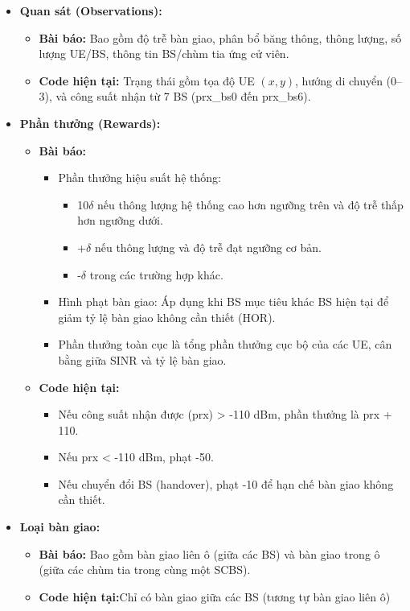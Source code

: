\documentclass{article} %
\begin{document}
\begin{itemize}
    \item \textbf{Quan sát (Observations):} 
    \begin{itemize}
        \item \textbf{Bài báo:} Bao gồm độ trễ bàn giao, phân bổ băng thông, thông lượng, số lượng UE/BS, thông tin BS/chùm tia ứng cử viên.
        \item \textbf{Code hiện tại:} Trạng thái gồm tọa độ UE $(x, y)$, hướng di chuyển (0–3), và công suất nhận từ 7 BS (prx\_bs0 đến prx\_bs6).
    \end{itemize}
        \item \textbf{Phần thưởng (Rewards):} 
        \begin{itemize}
            \item \textbf{Bài báo:} 
            \begin{itemize}
                \item Phần thưởng hiệu suất hệ thống:
                \begin{itemize}
                    \item 10$\delta$ nếu thông lượng hệ thống cao hơn ngưỡng trên và độ trễ thấp hơn ngưỡng dưới. 
                    \item +$\delta$ nếu thông lượng và độ trễ đạt ngưỡng cơ bản.
                    \item -$\delta$ trong các trường hợp khác. 
                \end{itemize}
                \item Hình phạt bàn giao: Áp dụng khi BS mục tiêu khác BS hiện tại để giảm tỷ lệ bàn giao không cần thiết (HOR).
                \item Phần thưởng toàn cục là tổng phần thưởng cục bộ của các UE, cân bằng giữa SINR và tỷ lệ bàn giao.
            \end{itemize}
            \item \textbf{Code hiện tại:}
            \begin{itemize}
                \item Nếu công suất nhận được (prx) > -110 dBm, phần thưởng là prx + 110.
                \item Nếu prx < -110 dBm, phạt -50.
                \item Nếu chuyển đổi BS (handover), phạt -10 để hạn chế bàn giao không cần thiết.
            \end{itemize}
        \end{itemize}
        \item \textbf{Loại bàn giao:} 
        \begin{itemize}
            \item \textbf{Bài báo:} Bao gồm bàn giao liên ô (giữa các BS) và bàn giao trong ô (giữa các chùm tia trong cùng một SCBS).
            \item \textbf{Code hiện tại:}Chỉ có bàn giao giữa các BS (tương tự bàn giao liên ô)
        \end{itemize}
    \end{itemize}
\end{document}
